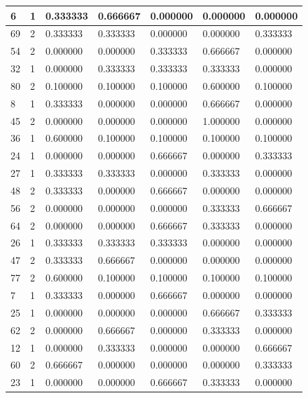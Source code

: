 \documentclass[materials,article,submit,pdftex,moreauthors]{Definitions/mdpi}
\begin{document}
\begin{table}[H]
\begin{scriptsize}
\begin{minipage}{0.40\linewidth}
{\begin{tabularx}{\linewidth}{@{} |l|l|l|l|l|l|l|}
        6 & 1 & 0.333333 & 0.666667 & 0.000000 & 0.000000 & 0.000000 \\ \hline
        69 & 2 & 0.333333 & 0.333333 & 0.000000 & 0.000000 & 0.333333 \\ \hline
        54 & 2 & 0.000000 & 0.000000 & 0.333333 & 0.666667 & 0.000000 \\ \hline
        32 & 1 & 0.000000 & 0.333333 & 0.333333 & 0.333333 & 0.000000 \\ \hline
        80 & 2 & 0.100000 & 0.100000 & 0.100000 & 0.600000 & 0.100000 \\ \hline
        8 & 1 & 0.333333 & 0.000000 & 0.000000 & 0.666667 & 0.000000 \\ \hline
        45 & 2 & 0.000000 & 0.000000 & 0.000000 & 1.000000 & 0.000000 \\ \hline
        36 & 1 & 0.600000 & 0.100000 & 0.100000 & 0.100000 & 0.100000 \\ \hline
        24 & 1 & 0.000000 & 0.000000 & 0.666667 & 0.000000 & 0.333333 \\ \hline
        27 & 1 & 0.333333 & 0.333333 & 0.000000 & 0.333333 & 0.000000 \\ \hline
        48 & 2 & 0.333333 & 0.000000 & 0.666667 & 0.000000 & 0.000000 \\ \hline
        56 & 2 & 0.000000 & 0.000000 & 0.000000 & 0.333333 & 0.666667 \\ \hline
        64 & 2 & 0.000000 & 0.000000 & 0.666667 & 0.333333 & 0.000000 \\ \hline
        26 & 1 & 0.333333 & 0.333333 & 0.333333 & 0.000000 & 0.000000 \\ \hline
        47 & 2 & 0.333333 & 0.666667 & 0.000000 & 0.000000 & 0.000000 \\ \hline
        77 & 2 & 0.600000 & 0.100000 & 0.100000 & 0.100000 & 0.100000 \\ \hline
        7 & 1 & 0.333333 & 0.000000 & 0.666667 & 0.000000 & 0.000000 \\ \hline
        25 & 1 & 0.000000 & 0.000000 & 0.000000 & 0.666667 & 0.333333 \\ \hline
        62 & 2 & 0.000000 & 0.666667 & 0.000000 & 0.333333 & 0.000000 \\ \hline
        12 & 1 & 0.000000 & 0.333333 & 0.000000 & 0.000000 & 0.666667 \\ \hline
        60 & 2 & 0.666667 & 0.000000 & 0.000000 & 0.000000 & 0.333333 \\ \hline
        23 & 1 & 0.000000 & 0.000000 & 0.666667 & 0.333333 & 0.000000 \\ \hline

\end{tabularx}}
\end{minipage}
\end{scriptsize}
\end{table}
\end{document}
